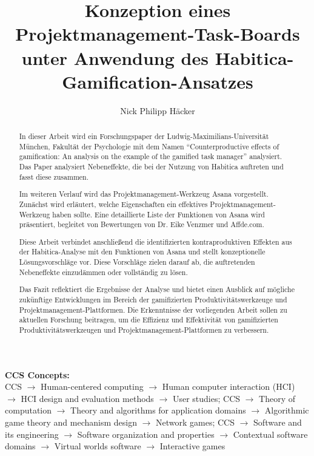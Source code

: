 \documentclass[sigconf, nonacm]{acmart}
\newcommand\holopagestyle{plain}
\begin{document}
\title{Konzeption eines Projektmanagement-Task-Boards unter Anwendung des Habitica-Gamification-Ansatzes}

\author{Nick Philipp Häcker}




\begin{abstract}
In dieser Arbeit wird ein Forschungspaper der Ludwig-Maximilians-Universität München, Fakultät der Psychologie mit dem Namen \enquote{Counterproductive effects of gamification: An analysis \allowbreak on the example of the gamified task manager} analysiert. Das Paper analysiert Nebeneffekte, die bei der Nutzung von Habitica auftreten und fasst diese zusammen.

Im weiteren Verlauf wird das Projektmanagement-Werkzeug Asana vorgestellt. Zunächst wird erläutert, welche Eigenschaften ein effektives Projektmanagement-Werkzeug haben sollte. Eine detaillierte Liste der Funktionen von Asana wird präsentiert, begleitet von Bewertungen von Dr. Eike Venzmer und Affde.com.

Diese Arbeit verbindet anschließend die identifizierten kontraproduktiven Effekten aus der Habitica-Analyse mit den Funktionen von Asana und stellt konzeptionelle Lösungsvorschläge vor. Diese Vorschläge zielen darauf ab, die auftretenden Nebeneffekte einzudämmen oder vollständig zu lösen.

Das Fazit reflektiert die Ergebnisse der Analyse und bietet einen Ausblick auf mögliche zukünftige Entwicklungen im Bereich der gamifizierten Produktivitätswerkzeuge und Projektmanagement-Plattformen. Die Erkenntnisse der vorliegenden Arbeit sollen zu aktuellen Forschung beitragen, um die Effizienz und Effektivität von gamifizierten Produktivitätswerkzeugen und Projektmanagement-Plattformen zu verbessern.
\end{abstract}

\maketitle

\pagestyle{\holopagestyle}
\begingroup\small\noindent\raggedright\textbf{CCS Concepts:}\\
CCS $\rightarrow$ Human-centered computing $\rightarrow$ Human computer interaction (HCI) $\rightarrow$ HCI design and evaluation methods $\rightarrow$ User studies;
CCS $\rightarrow$ Theory of computation $\rightarrow$ Theory and algorithms for application domains $\rightarrow$ Algorithmic game theory and mechanism design $\rightarrow$ Network games; CCS $\rightarrow$ Software and its engineering $\rightarrow$ Software organization and properties $\rightarrow$ Contextual software domains $\rightarrow$ Virtual worlds software $\rightarrow$ Interactive games
\end{document}
